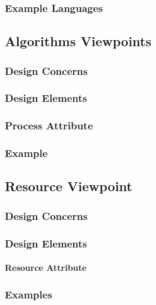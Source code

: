 \documentclass[letterpaper,10pt,titlepage,draftclsnofoot,onecolumn,onesided] {IEEEtran}
\begin{document}
\subsubsection{Example Languages}

\subsection{Algorithms Viewpoints}
\subsubsection{Design Concerns}
\subsubsection{Design Elements}
\subsubsection{Process Attribute}
\subsubsection{Example}

\subsection{Resource Viewpoint}
\subsubsection{Design Concerns}
\subsubsection{Design Elements}
\paragraph{Resource Attribute}
\subsubsection{Examples}




%
%
\end{document}
